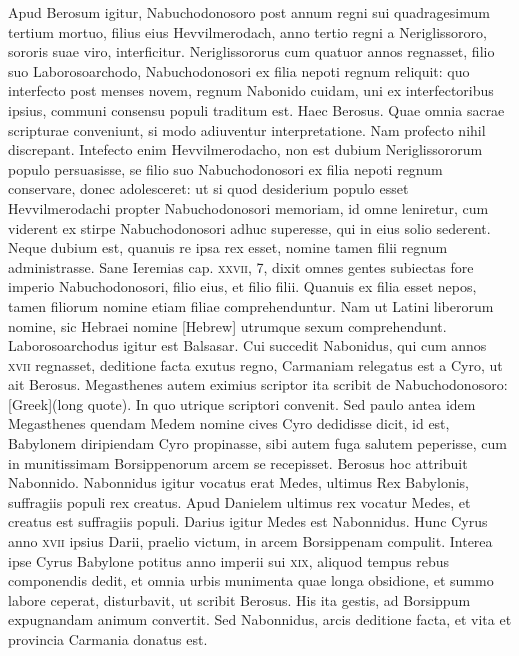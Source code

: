 \begin{parnumbers}
{}
\lnr{}Apud Berosum igitur, Nabuchodonosoro
post annum regni sui quadragesimum tertium mortuo, filius
eius Hevvilmerodach, anno tertio regni a Neriglissororo, sororis
suae viro, interficitur.
\lnr{}Neriglissororus cum quatuor annos regnasset,
filio suo Laborosoarchodo, Nabuchodonosori ex filia nepoti
regnum reliquit: quo interfecto post menses novem, regnum Nabonido
cuidam, uni ex interfectoribus ipsius, communi consensu
populi traditum est.
\lnr{}Haec Berosus.
\lnr{}Quae omnia sacrae scripturae conveniunt,
si modo adiuventur interpretatione.
\lnr{}Nam profecto nihil
discrepant.
\lnr{}Intefecto enim Hevvilmerodacho, non est dubium
Neriglissororum populo persuasisse, se filio suo Nabuchodonosori
ex filia nepoti regnum conservare, donec adolesceret: ut si quod
desiderium populo esset Hevvilmerodachi propter Nabuchodonosori
memoriam, id omne leniretur, cum viderent ex stirpe Nabuchodonosori
adhuc superesse, qui in eius solio sederent.
\lnr{}Neque dubium est, quanuis re ipsa rex esset, nomine tamen filii regnum
administrasse.
\lnr{}Sane Ieremias cap. \textsc{xxvii}, 7, dixit omnes gentes subiectas
fore imperio Nabuchodonosori, filio eius, et filio filii.
\lnr{}Quanuis ex filia esset nepos, tamen filiorum nomine etiam filiae
 comprehenduntur.
\lnr{}Nam ut Latini liberorum nomine, sic Hebraei nomine
\texthebrew{[Hebrew]} utrumque sexum comprehendunt.
\lnr{}Laborosoarchodus igitur
est Balsasar.
\lnr{}Cui succedit Nabonidus, qui cum annos \textsc{xvii} regnasset,
deditione facta exutus regno, Carmaniam relegatus est a Cyro,
ut ait Berosus.
\lnr{}Megasthenes autem eximius scriptor ita scribit de
Nabuchodonosoro: \textgreek{[Greek](long quote)}.
\lnr{}In
quo utrique scriptori convenit.
\lnr{}Sed paulo antea idem Megasthenes
quendam Medem nomine cives Cyro dedidisse dicit, id est, Babylonem
diripiendam Cyro propinasse, sibi autem fuga salutem peperisse,
cum in munitissimam Borsippenorum arcem se recepisset.
\lnr{}Berosus hoc attribuit Nabonnido.
\lnr{}Nabonnidus igitur vocatus erat
Medes, ultimus Rex Babylonis, suffragiis populi rex creatus.
\lnr{}Apud
Danielem ultimus rex vocatur Medes, et creatus est suffragiis populi.
\lnr{}Darius igitur Medes est Nabonnidus.
\lnr{}Hunc Cyrus anno \textsc{xvii}
ipsius Darii, praelio victum, in arcem Borsippenam compulit.
\lnr{}Interea ipse Cyrus Babylone potitus anno imperii sui \textsc{xix}, aliquod
tempus rebus componendis dedit, et omnia urbis munimenta
quae longa obsidione, et summo labore ceperat, disturbavit, ut
scribit Berosus.
\lnr{}His ita gestis, ad Borsippum expugnandam animum
convertit.
\lnr{}Sed Nabonnidus, arcis deditione facta, et vita
et provincia Carmania donatus est.


\end{parnumbers}
